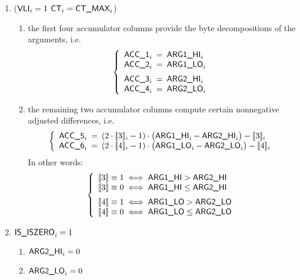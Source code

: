 \begin{enumerate}[resume]
	\item \If ($\textsf{VLI}_{i} = 1$ \et $\textsf{CT}_{i} = \textsf{CT\_MAX}_{i}$) \Then
	\begin{enumerate}
		\item the first four accumulator columns provide the byte decompositions of the arguments, i.e.
			\[
				\left\{
				\begin{array}{lcl}
					\acc{1}_{i} & \!\!\! = \!\!\! & \argOneHi_{i} \\
					\acc{2}_{i} & \!\!\! = \!\!\! & \argOneLo_{i} \vspace{2mm} \\
					\acc{3}_{i} & \!\!\! = \!\!\! & \argTwoHi_{i} \\
					\acc{4}_{i} & \!\!\! = \!\!\! & \argTwoLo_{i} \\
				\end{array}
				\right.
			\]
		\item the remaining two accumulator columns compute certain nonnegative adjusted differences, i.e.
			\[
				\left\{
				\begin{array}{lcl}
					\acc{5}_{i} & \!\!\! = \!\!\! & (2\cdot\bit{3}_{i} - 1) \cdot \big(\argOneHi_{i} - \argTwoHi_{i}\big) - \bit{3}_{i} \\
					\acc{6}_{i} & \!\!\! = \!\!\! & (2\cdot\bit{4}_{i} - 1) \cdot \big(\argOneLo_{i} - \argTwoLo_{i}\big) - \bit{4}_{i} \\
				\end{array}
				\right.
			\]
			In other words:
			\[
				\left\{
				\begin{array}{l}
					\bit{3} \equiv 1 \iff \argOneHi >    \argTwoHi \\
					\bit{3} \equiv 0 \iff \argOneHi \leq \argTwoHi \vspace{2mm} \\
					\bit{4} \equiv 1 \iff \argOneLo >    \argTwoLo \\
					\bit{4} \equiv 0 \iff \argOneLo \leq \argTwoLo \\
				\end{array}
				\right.
			\]
	\end{enumerate}
	\item \If $\textsf{IS\_ISZERO}_{i} = 1$ \Then
			\begin{enumerate}
				\item $\textsf{ARG}\textsf{2}\textsf{\_HI}_{i} = 0$
				\item $\textsf{ARG}\textsf{2}\textsf{\_LO}_{i} = 0$
			\end{enumerate}
\end{enumerate}